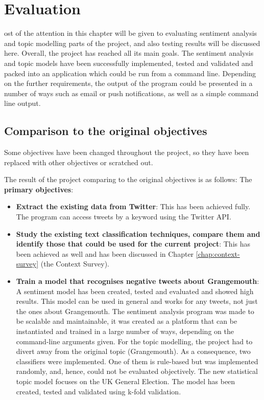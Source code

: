 \let\textcircled=\pgftextcircled
\chapter{Evaluation}
\label{chap:evaluation}


ost of the attention in this chapter will be given to evaluating sentiment analysis and topic modelling parts of the project, and also testing results will be discussed here.
Overall, the project has reached all its main goals. The sentiment analysis and topic models have been successfully implemented, tested and validated and packed into an application which could be run from a command line. Depending on the further requirements, the output of the program could be presented in a number of ways such as email or push notifications, as well as a simple command line output. 

\section{Comparison to the original objectives}
Some objectives have been changed throughout the project, so they have been replaced with other objectives or scratched out. 

\label{sec:originalObjectives}
The result of the project comparing to the original objectives is as follows:
The \textbf{primary objectives}:
\begin{itemize}
    \item \textbf{Extract the existing data from Twitter}: This has been achieved fully. The program can access tweets by a keyword using the Twitter API. 
    \item \textbf{Study the existing text classification techniques, compare them and identify those that could be used for the current project}: This has been achieved as well and has been discussed in Chapter \ref{chap:context-survey} (the Context Survey). 
    \item \textbf{Train a model that recognises negative tweets about Grangemouth}: A sentiment model has been created, tested and evaluated and showed high results. This model can be used in general and works for any tweets, not just the ones about Grangemouth. The sentiment analysis program was made to be scalable and maintainable, it was created as a platform that can be instantiated and trained in a large number of ways, depending on the command-line arguments given. For the topic modelling, the project had to divert away from the original topic (Grangemouth). As a consequence, two classifiers were implemented. One of them is rule-based but was implemented randomly, and, hence, could not be evaluated objectively. The new statistical topic model focuses on the UK General Election. The model has been created, tested and validated using k-fold validation. 
\end{itemize}

